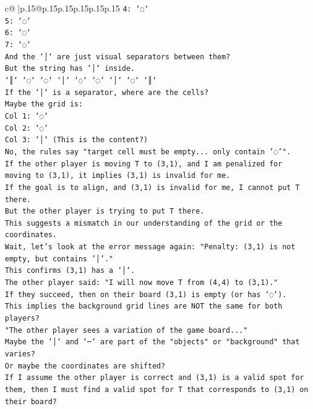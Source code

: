 \documentclass{article}
\begin{document}
{\begin{supertabular}{c@{$\;$}|p{.15\linewidth}@{}p{.15\linewidth}p{.15\linewidth}p{.15\linewidth}p{.15\linewidth}p{.15\linewidth}}
{{{\texttt{4: `◌`} \\
\texttt{5: `◌`} \\
\texttt{6: `◌`} \\
\texttt{7: `◌`} \\
\texttt{And the `│` are just visual separators between them?} \\
\texttt{But the string has `│` inside.} \\
\texttt{`║` `◌` `◌` `│` `◌` `◌` `│` `◌` `║`} \\
\texttt{If the `│` is a separator, where are the cells?} \\
\texttt{Maybe the grid is:} \\
\texttt{Col 1: `◌`} \\
\texttt{Col 2: `◌`} \\
\texttt{Col 3: `│` (This is the content?)} \\
\texttt{No, the rules say "target cell must be empty... only contain '◌'".} \\
\texttt{If the other player is moving T to (3,1), and I am penalized for moving to (3,1), it implies (3,1) is invalid for me.} \\
\texttt{If the goal is to align, and (3,1) is invalid for me, I cannot put T there.} \\
\texttt{But the other player is trying to put T there.} \\
\texttt{This suggests a mismatch in our understanding of the grid or the coordinates.} \\
\texttt{Wait, let's look at the error message again: "Penalty: (3,1) is not empty, but contains '│'."} \\
\texttt{This confirms (3,1) has a `│`.} \\
\texttt{The other player said: "I will now move T from (4,4) to (3,1)."} \\
\texttt{If they succeed, then on their board (3,1) is empty (or has `◌`).} \\
\texttt{This implies the background grid lines are NOT the same for both players?} \\
\texttt{"The other player sees a variation of the game board..."} \\
\texttt{Maybe the `│` and `─` are part of the "objects" or "background" that varies?} \\
\texttt{Or maybe the coordinates are shifted?} \\
\texttt{If I assume the other player is correct and (3,1) is a valid spot for them, then I must find a valid spot for T that corresponds to (3,1) on their board?} \\
}}}
\end{supertabular}}
\end{document}
